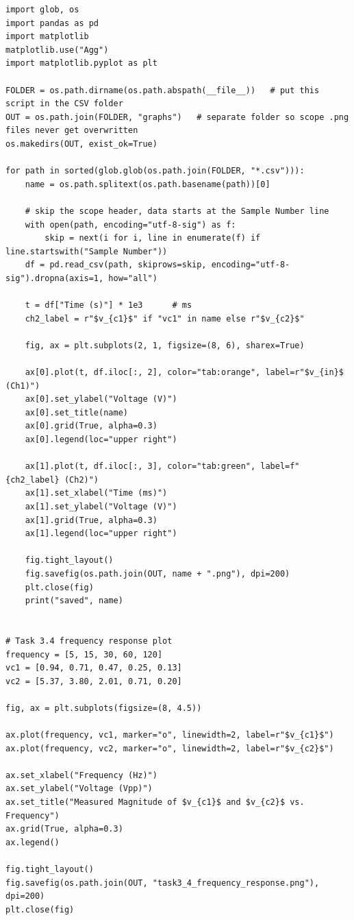 \documentclass[12pt]{article}
\begin{document}
\begin{lstlisting}[style=python, caption={Python code used for graphing raw CSVs for Part 3, as well as table data for Task 3.4.}]
import glob, os
import pandas as pd
import matplotlib
matplotlib.use("Agg")
import matplotlib.pyplot as plt

FOLDER = os.path.dirname(os.path.abspath(__file__))   # put this script in the CSV folder
OUT = os.path.join(FOLDER, "graphs")   # separate folder so scope .png files never get overwritten
os.makedirs(OUT, exist_ok=True)

for path in sorted(glob.glob(os.path.join(FOLDER, "*.csv"))):
    name = os.path.splitext(os.path.basename(path))[0]

    # skip the scope header, data starts at the Sample Number line
    with open(path, encoding="utf-8-sig") as f:
        skip = next(i for i, line in enumerate(f) if line.startswith("Sample Number"))
    df = pd.read_csv(path, skiprows=skip, encoding="utf-8-sig").dropna(axis=1, how="all")

    t = df["Time (s)"] * 1e3      # ms
    ch2_label = r"$v_{c1}$" if "vc1" in name else r"$v_{c2}$"

    fig, ax = plt.subplots(2, 1, figsize=(8, 6), sharex=True)

    ax[0].plot(t, df.iloc[:, 2], color="tab:orange", label=r"$v_{in}$ (Ch1)")
    ax[0].set_ylabel("Voltage (V)")
    ax[0].set_title(name)
    ax[0].grid(True, alpha=0.3)
    ax[0].legend(loc="upper right")

    ax[1].plot(t, df.iloc[:, 3], color="tab:green", label=f"{ch2_label} (Ch2)")
    ax[1].set_xlabel("Time (ms)")
    ax[1].set_ylabel("Voltage (V)")
    ax[1].grid(True, alpha=0.3)
    ax[1].legend(loc="upper right")

    fig.tight_layout()
    fig.savefig(os.path.join(OUT, name + ".png"), dpi=200)
    plt.close(fig)
    print("saved", name)


# Task 3.4 frequency response plot
frequency = [5, 15, 30, 60, 120]
vc1 = [0.94, 0.71, 0.47, 0.25, 0.13]
vc2 = [5.37, 3.80, 2.01, 0.71, 0.20]

fig, ax = plt.subplots(figsize=(8, 4.5))

ax.plot(frequency, vc1, marker="o", linewidth=2, label=r"$v_{c1}$")
ax.plot(frequency, vc2, marker="o", linewidth=2, label=r"$v_{c2}$")

ax.set_xlabel("Frequency (Hz)")
ax.set_ylabel("Voltage (Vpp)")
ax.set_title("Measured Magnitude of $v_{c1}$ and $v_{c2}$ vs. Frequency")
ax.grid(True, alpha=0.3)
ax.legend()

fig.tight_layout()
fig.savefig(os.path.join(OUT, "task3_4_frequency_response.png"), dpi=200)
plt.close(fig)



\end{lstlisting}
\end{document}
